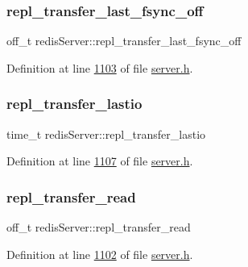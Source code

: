 \subsubsection{\texorpdfstring{repl\+\_\+transfer\+\_\+last\+\_\+fsync\+\_\+off}{repl\_transfer\_last\_fsync\_off}}
{\footnotesize\ttfamily off\+\_\+t redis\+Server\+::repl\+\_\+transfer\+\_\+last\+\_\+fsync\+\_\+off}



Definition at line \hyperlink{server_8h_source_l01103}{1103} of file \hyperlink{server_8h_source}{server.\+h}.

\mbox{\label{structredisServer_aef8f47c1883b1ab1ba15bdc409d95af7}} 
\subsubsection{\texorpdfstring{repl\+\_\+transfer\+\_\+lastio}{repl\_transfer\_lastio}}
{\footnotesize\ttfamily time\+\_\+t redis\+Server\+::repl\+\_\+transfer\+\_\+lastio}



Definition at line \hyperlink{server_8h_source_l01107}{1107} of file \hyperlink{server_8h_source}{server.\+h}.

\mbox{\label{structredisServer_a6b871bc528ee6b0a1507458d4e7b92d8}} 
\subsubsection{\texorpdfstring{repl\+\_\+transfer\+\_\+read}{repl\_transfer\_read}}
{\footnotesize\ttfamily off\+\_\+t redis\+Server\+::repl\+\_\+transfer\+\_\+read}



Definition at line \hyperlink{server_8h_source_l01102}{1102} of file \hyperlink{server_8h_source}{server.\+h}.

\mbox{\label{structredisServer_a79362be891e54be9e5cc0ea70403ebe9}} 

